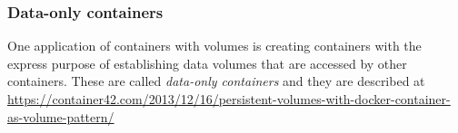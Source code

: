 \documentclass[10pt]{beamer}
\begin{document}
\begin{frame}
	\frametitle{Data-only containers}
	
	One application of containers with volumes is creating containers with the express purpose of establishing data volumes that are accessed by other containers.  These are called \emph{data-only containers} and they are described at \\
	 {\footnotesize \url{https://container42.com/2013/12/16/persistent-volumes-with-docker-container-as-volume-pattern/}}
\end{frame}
\end{document}
